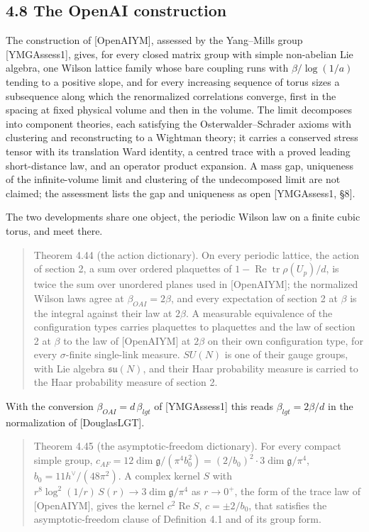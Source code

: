 \documentclass[10pt,letterpaper,twocolumn]{article}
\providecommand{\rm}{}\DeclareOldFontCommand{\rm}{\normalfont\rmfamily}{\mathrm}
\begin{document}
\subsection{4.8 The OpenAI construction}\label{48-the-openai-construction}

The construction of {[}OpenAIYM{]}, assessed by the Yang--Mills group {[}YMGAssess1{]}, gives, for every closed matrix group with simple non-abelian Lie algebra, one Wilson lattice family whose bare coupling runs with \(\beta/\log(1/a)\) tending to a positive slope, and for every increasing sequence of torus sizes a subsequence along which the renormalized correlations converge, first in the spacing at fixed physical volume and then in the volume. The limit decomposes into component theories, each satisfying the Osterwalder--Schrader axioms with clustering and reconstructing to a Wightman theory; it carries a conserved stress tensor with its translation Ward identity, a centred trace with a proved leading short-distance law, and an operator product expansion. A mass gap, uniqueness of the infinite-volume limit and clustering of the undecomposed limit are not claimed; the assessment lists the gap and uniqueness as open {[}YMGAssess1, §8{]}.

The two developments share one object, the periodic Wilson law on a finite cubic torus, and meet there.

\begin{quote}
Theorem 4.44 (the action dictionary). On every periodic lattice, the action of section 2, a sum over ordered plaquettes of \(1-\operatorname{Re}\operatorname{tr}\rho(U_p)/d\), is twice the sum over unordered planes used in {[}OpenAIYM{]}; the normalized Wilson laws agree at \(\beta_{\rm OAI}=2\beta\), and every expectation of section 2 at \(\beta\) is the integral against their law at \(2\beta\). A measurable equivalence of the configuration types carries plaquettes to plaquettes and the law of section 2 at \(\beta\) to the law of {[}OpenAIYM{]} at \(2\beta\) on their own configuration type, for every \(\sigma\)-finite single-link measure. \(SU(N)\) is one of their gauge groups, with Lie algebra \(\mathfrak{su}(N)\), and their Haar probability measure is carried to the Haar probability measure of section 2.
\end{quote}

With the conversion \(\beta_{\rm OAI}=d\,\beta_{\rm lgt}\) of {[}YMGAssess1{]} this reads \(\beta_{\rm lgt}=2\beta/d\) in the normalization of {[}DouglasLGT{]}.

\begin{quote}
Theorem 4.45 (the asymptotic-freedom dictionary). For every compact simple group, \(c_{\rm AF}=12\dim\mathfrak g/(\pi^4b_0^2)=(2/b_0)^2\cdot3\dim\mathfrak g/\pi^4\), \(b_0=11h^\vee/(48\pi^2)\). A complex kernel \(S\) with \(r^8\log^2(1/r)\,S(r)\to3\dim\mathfrak g/\pi^4\) as \(r\to0^+\), the form of the trace law of {[}OpenAIYM{]}, gives the kernel \(c^2\operatorname{Re}S\), \(c=\pm2/b_0\), that satisfies the asymptotic-freedom clause of Definition 4.1 and of its group form.
\end{quote}
\end{document}
